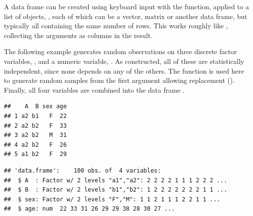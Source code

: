 \documentclass[11pt]{book}
\renewenvironment{knitrout}{\small\renewcommand{\baselinestretch}{.85}}{} %
\begin{document}
A data frame can be created using keyboard input 
with the  function, applied to a list of objects,
, each of which can be a vector, matrix or another
data frame, but typically all containing the same number of rows.
This works roughly like , collecting the arguments as columns
in the result.

The following example generates  random observations on 
three discrete factor variables, , and a numeric
variable, .  As constructed, all of these are 
statistically independent, since none depends on any of the others.
The function 
is used here to generate  random samples from the
first argument allowing replacement ().
Finally, all four variables are combined into the data frame
.


\begin{knitrout}
\color{fgcolor}\begin{kframe}
\begin{alltt}
\hlstd{(}\hlstd{)}   
\hlkwb{=}
 \hlkwb{<-} \hlstd{(}\hlstd{(}\hlstd{(}\hlstd{,} \hlstd{=}\hlstd{))}
 \hlkwb{<-} \hlstd{(}\hlstd{(}\hlstd{(}\hlstd{,} \hlstd{=}\hlstd{))}
 \hlkwb{<-} \hlstd{(}\hlstd{(}\hlstd{(}\hlstd{,}  \hlstd{=}\hlstd{))}
 \hlkwb{<-} \hlstd{(} \hlstd{=}\hlstd{,} \hlstd{=}\hlstd{))}
 \hlkwb{<-} 
\hlstd{)}
\end{alltt}
\begin{verbatim}
##    A  B sex age
## 1 a2 b1   F  22
## 2 a2 b2   F  33
## 3 a2 b2   M  31
## 4 a2 b2   F  26
## 5 a1 b2   F  29
\end{verbatim}
\begin{alltt}
\end{alltt}
\begin{verbatim}
## 'data.frame':	100 obs. of  4 variables:
##  $ A  : Factor w/ 2 levels "a1","a2": 2 2 2 2 1 1 1 2 2 2 ...
##  $ B  : Factor w/ 2 levels "b1","b2": 1 2 2 2 2 2 2 2 1 1 ...
##  $ sex: Factor w/ 2 levels "F","M": 1 1 2 1 1 1 2 2 1 1 ...
##  $ age: num  22 33 31 26 29 29 38 28 30 27 ...
\end{verbatim}
\end{kframe}
\end{knitrout}
\end{document}

